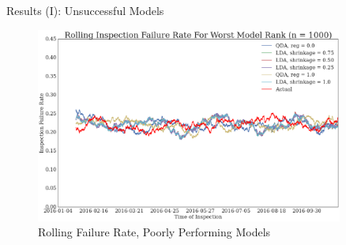 \documentclass[final]{beamer}
\newlength{\sepwid}
\newlength{\onecolwid}
\newlength{\twocolwid}
\begin{document}
\begin{frame}[t]
\begin{columns}[t]
\begin{column}{\onecolwid}

\end{column} %

\begin{column}{\sepwid}\end{column} %

\begin{column}{\twocolwid} %

\begin{columns}[t, totalwidth=\twocolwid]

\begin{column}{\onecolwid}\vspace{-.6in.}
\begin{block}{Results (I): Unsuccessful Models}

\begin{figure}
\includegraphics[width=\linewidth]{figures/exploration/rolling_failure_bad.png}
\caption{Rolling Failure Rate, Poorly Performing Models}
\end{figure}
\end{block}

\end{column}


\end{columns}
\end{column}
\end{columns}
\end{frame}
\end{document}
